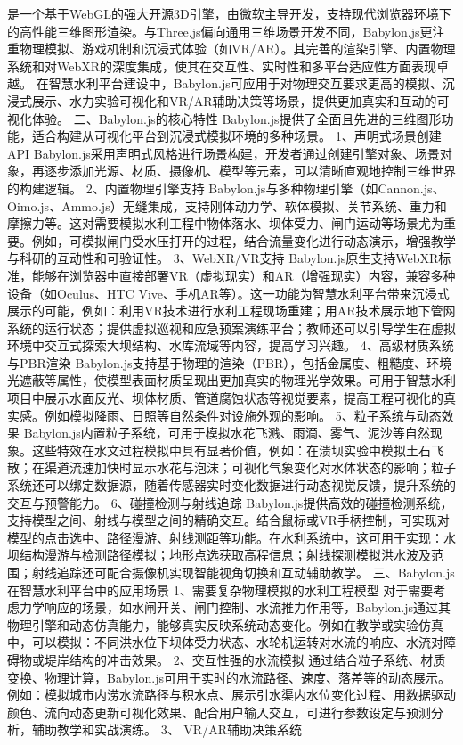{{{是一个基于WebGL的强大开源3D引擎，由微软主导开发，支持现代浏览器环境下的高性能三维图形渲染。与Three.js偏向通用三维场景开发不同，Babylon.js更注重物理模拟、游戏机制和沉浸式体验（如VR/AR）。其完善的渲染引擎、内置物理系统和对WebXR的深度集成，使其在交互性、实时性和多平台适应性方面表现卓越。 在智慧水利平台建设中，Babylon.js可应用于对物理交互要求更高的模拟、沉浸式展示、水力实验可视化和VR/AR辅助决策等场景，提供更加真实和互动的可视化体验。 二、Babylon.js的核心特性 Babylon.js提供了全面且先进的三维图形功能，适合构建从可视化平台到沉浸式模拟环境的多种场景。 1、声明式场景创建API Babylon.js采用声明式风格进行场景构建，开发者通过创建引擎对象、场景对象，再逐步添加光源、材质、摄像机、模型等元素，可以清晰直观地控制三维世界的构建逻辑。 2、内置物理引擎支持 Babylon.js与多种物理引擎（如Cannon.js、Oimo.js、Ammo.js）无缝集成，支持刚体动力学、软体模拟、关节系统、重力和摩擦力等。这对需要模拟水利工程中物体落水、坝体受力、闸门运动等场景尤为重要。例如，可模拟闸门受水压打开的过程，结合流量变化进行动态演示，增强教学与科研的互动性和可验证性。 3、WebXR/VR支持 Babylon.js原生支持WebXR标准，能够在浏览器中直接部署VR（虚拟现实）和AR（增强现实）内容，兼容多种设备（如Oculus、HTC Vive、手机AR等）。这一功能为智慧水利平台带来沉浸式展示的可能，例如：利用VR技术进行水利工程现场重建；用AR技术展示地下管网系统的运行状态；提供虚拟巡视和应急预案演练平台；教师还可以引导学生在虚拟环境中交互式探索大坝结构、水库流域等内容，提高学习兴趣。 4、高级材质系统与PBR渲染 Babylon.js支持基于物理的渲染（PBR），包括金属度、粗糙度、环境光遮蔽等属性，使模型表面材质呈现出更加真实的物理光学效果。可用于智慧水利项目中展示水面反光、坝体材质、管道腐蚀状态等视觉要素，提高工程可视化的真实感。例如模拟降雨、日照等自然条件对设施外观的影响。 5、粒子系统与动态效果 Babylon.js内置粒子系统，可用于模拟水花飞溅、雨滴、雾气、泥沙等自然现象。这些特效在水文过程模拟中具有显著价值，例如：在溃坝实验中模拟土石飞散；在渠道流速加快时显示水花与泡沫；可视化气象变化对水体状态的影响；粒子系统还可以绑定数据源，随着传感器实时变化数据进行动态视觉反馈，提升系统的交互与预警能力。 6、碰撞检测与射线追踪 Babylon.js提供高效的碰撞检测系统，支持模型之间、射线与模型之间的精确交互。结合鼠标或VR手柄控制，可实现对模型的点击选中、路径漫游、射线测距等功能。在水利系统中，这可用于实现：水坝结构漫游与检测路径模拟；地形点选获取高程信息；射线探测模拟洪水波及范围；射线追踪还可配合摄像机实现智能视角切换和互动辅助教学。 三、Babylon.js在智慧水利平台中的应用场景 1、需要复杂物理模拟的水利工程模型 对于需要考虑力学响应的场景，如水闸开关、闸门控制、水流推力作用等，Babylon.js通过其物理引擎和动态仿真能力，能够真实反映系统动态变化。例如在教学或实验仿真中，可以模拟：不同洪水位下坝体受力状态、水轮机运转对水流的响应、水流对障碍物或堤岸结构的冲击效果。 2、交互性强的水流模拟 通过结合粒子系统、材质变换、物理计算，Babylon.js可用于实时的水流路径、速度、落差等的动态展示。例如：模拟城市内涝水流路径与积水点、展示引水渠内水位变化过程、用数据驱动颜色、流向动态更新可视化效果、配合用户输入交互，可进行参数设定与预测分析，辅助教学和实战演练。 3、 VR/AR辅助决策系统 }}}
